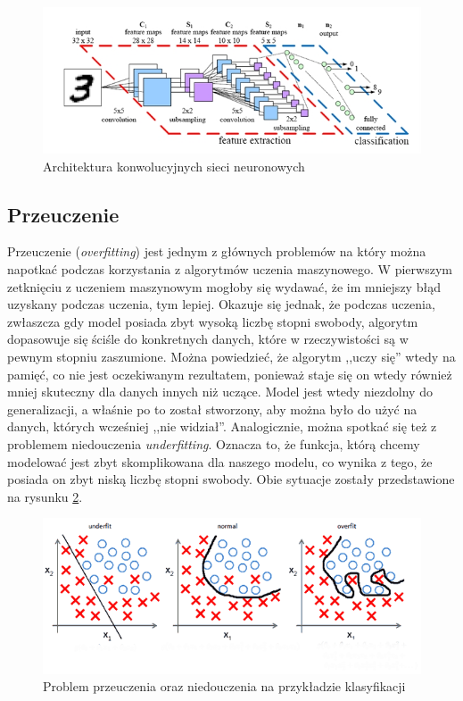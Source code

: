 \begin{figure}[ht!]
\centering
\includegraphics[scale=0.75]{res/cnn3.jpg}
\caption[Caption for LOF]{Architektura konwolucyjnych sieci neuronowych\footnotemark\label{cnn3}} 
\end{figure}

\subsection{Przeuczenie}
Przeuczenie (\textit{overfitting}) jest jednym z głównych problemów na który można napotkać podczas korzystania z algorytmów uczenia maszynowego. W pierwszym zetknięciu z uczeniem maszynowym mogłoby się wydawać, że im mniejszy błąd uzyskany podczas uczenia, tym lepiej. Okazuje się jednak, że podczas uczenia, zwłaszcza gdy model posiada zbyt wysoką liczbę stopni swobody, algorytm dopasowuje się ściśle do konkretnych danych, które w rzeczywistości są w pewnym stopniu zaszumione. Można powiedzieć, że algorytm ,,uczy się'' wtedy na pamięć, co nie jest oczekiwanym rezultatem, ponieważ staje się on wtedy również mniej skuteczny dla danych innych niż uczące. Model jest wtedy niezdolny do generalizacji, a właśnie po to został stworzony, aby można było do użyć na danych, których wcześniej ,,nie widział''. Analogicznie, można spotkać się też z problemem niedouczenia \textit{underfitting}. Oznacza to, że funkcja, którą chcemy modelować jest zbyt skomplikowana dla naszego modelu, co wynika z tego, że posiada on zbyt niską liczbę stopni swobody. Obie sytuacje zostały przedstawione na rysunku \ref{overfitting}.

\begin{figure}[ht!]
\centering
\includegraphics[scale=0.8]{res/overfitting.png}
\caption[Caption for LOF]{Problem przeuczenia oraz niedouczenia na przykładzie klasyfikacji\footnotemark \label{overfitting}} 
\end{figure}

